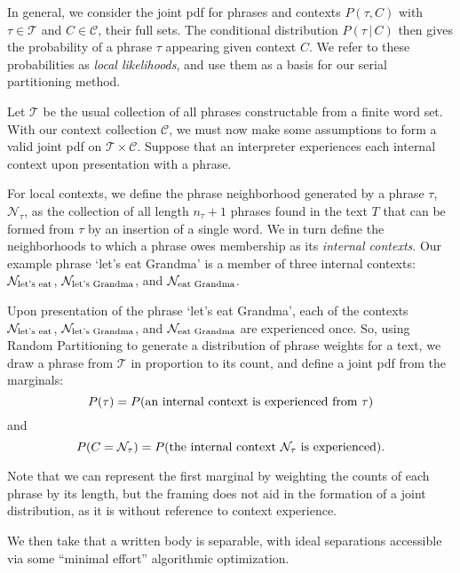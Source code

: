 



In general, we consider the joint pdf for phrases and contexts
$P(\tau,C)$ with $\tau \in \mathcal{T}$ and $C \in \mathcal{C}$, their
full sets.
The conditional distribution $P(\tau \,|\, C)$
then gives the probability of a phrase $\tau$ appearing
given context $C$.
We refer to these probabilities as \textit{local likelihoods}, 
and use them as a basis for our serial partitioning method.

Let $\mathcal{T}$ be the usual collection of all phrases constructable from a
finite word set.
With our context collection $\mathcal{C}$, we must now make some
assumptions to form a valid joint pdf on $\mathcal{T}\times\mathcal{C}$.
Suppose that an interpreter experiences each internal context upon
presentation with a phrase.


For local contexts, we define the phrase neighborhood generated by a phrase
$\tau$, $\mathcal{N}_\tau$, as the collection of
all length $n_{\tau}+1$ phrases found in the text $T$
that can be formed from $\tau$ by an insertion of a single word.
We in turn define the neighborhoods to which a phrase 
owes membership as its \textit{internal contexts}.
Our example phrase `let's eat Grandma' 
is a member of three internal
contexts: $\mathcal{N}_{\textnormal{let's eat}}$, 
$\mathcal{N}_{\textnormal{let's Grandma}}$, 
and $\mathcal{N}_{\textnormal{eat Grandma}}$.

Upon presentation of the phrase
`let's eat Grandma', each of the contexts
$\mathcal{N}_{\textnormal{let's eat}}$,
$\mathcal{N}_{\textnormal{let's Grandma}}$, and
  $\mathcal{N}_{\textnormal{eat Grandma}}$ are experienced once.
So, using Random Partitioning to generate
a distribution of phrase weights for a text, we draw a
phrase from $\mathcal{T}$ in proportion to its count, and define a joint pdf
from the marginals:
$$
P(\tau)=P(\textnormal{an internal context is experienced from $\tau$})
$$
and
$$
P(C=\mathcal{N}_\tau)
=
P(\textnormal{the internal context $\mathcal{N}_\tau$ is experienced}).
$$


Note that we can represent the first marginal by weighting the counts
of each phrase by its length, but the framing does not aid in the
formation of a joint distribution, as it is without reference to
context experience.



We then take that a written body is separable, with ideal separations
accessible via some ``minimal effort'' algorithmic optimization.




